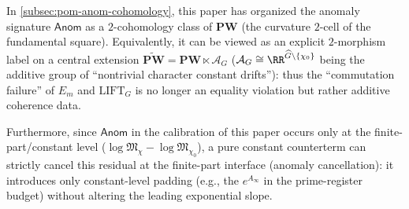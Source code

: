 \begin{remark}\label{rem:pom-bridge-kit-strictification}
In \ref{subsec:pom-anom-cohomology}, this paper has organized the anomaly signature \(\mathsf{Anom}\) as a \(2\)-cohomology class of \(\mathbf{PW}\) (the curvature \(2\)-cell of the fundamental square). Equivalently, it can be viewed as an explicit \(2\)-morphism label on a central extension
\(
\widetilde{\mathbf{PW}}=\mathbf{PW}\ltimes \mathcal{A}_G
\)
(\(\mathcal{A}_G\cong\RR^{\widehat G\setminus\{\chi_0\}}\) being the additive group of ``nontrivial character constant drifts''): thus the ``commutation failure'' of \(E_m\) and \(\mathrm{LIFT}_G\) is no longer an equality violation but rather additive coherence data.
\par
Furthermore, since \(\mathsf{Anom}\) in the calibration of this paper occurs only at the finite-part/constant level (\(\log\mathfrak{M}_\chi-\log\mathfrak{M}_{\chi_0}\)), a pure constant counterterm can strictly cancel this residual at the finite-part interface (anomaly cancellation): it introduces only constant-level padding (e.g., the \(e^{A_\infty}\) in the prime-register budget) without altering the leading exponential slope.
\end{remark}
